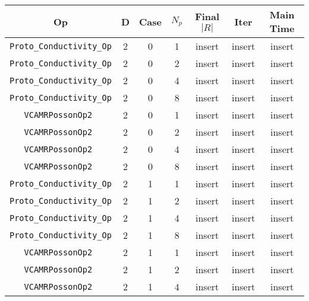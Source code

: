 \documentclass{article}
\begin{document}




\begin{small}
\begin{table}
\begin{center}
\begin{tabular}{|c|c|c|c|c|c||c|} \hline
 Op & D & Case & $N_p$ & Final $|R|$  &  Iter & Main Time \\
\hline
 {\tt Proto\_Conductivity\_Op} & 2 & 0 &   1    &  insert  &  insert    & insert   \\
 {\tt Proto\_Conductivity\_Op} & 2 & 0 &   2    &  insert  &  insert    & insert   \\
 {\tt Proto\_Conductivity\_Op} & 2 & 0 &   4    &  insert  &  insert    & insert   \\
 {\tt Proto\_Conductivity\_Op} & 2 & 0 &   8    &  insert  &  insert    & insert   \\
\hline                                                                                
 {\tt VCAMRPossonOp2 }         & 2 & 0   & 1    &  insert  &  insert    & insert    \\
 {\tt VCAMRPossonOp2 }         & 2 & 0   & 2    &  insert  &  insert    & insert    \\
 {\tt VCAMRPossonOp2 }         & 2 & 0   & 4    &  insert  &  insert    & insert    \\
 {\tt VCAMRPossonOp2 }         & 2 & 0   & 8    &  insert  &  insert    & insert    \\
\hline                                                                                
 {\tt Proto\_Conductivity\_Op} & 2 & 1   & 1    &  insert  &  insert    & insert   \\
 {\tt Proto\_Conductivity\_Op} & 2 & 1   & 2    &  insert  &  insert    & insert   \\
 {\tt Proto\_Conductivity\_Op} & 2 & 1   & 4    &  insert  &  insert    & insert   \\
 {\tt Proto\_Conductivity\_Op} & 2 & 1   & 8    &  insert  &  insert    & insert   \\
\hline                                                                                
 {\tt VCAMRPossonOp2 }         & 2 & 1   & 1    &  insert  &  insert    & insert    \\
 {\tt VCAMRPossonOp2 }         & 2 & 1   & 2    &  insert  &  insert    & insert    \\
 {\tt VCAMRPossonOp2 }         & 2 & 1   & 4    &  insert  &  insert    & insert    \\

\end{tabular}
\end{center}
\end{table}
\end{small}
\end{document}
